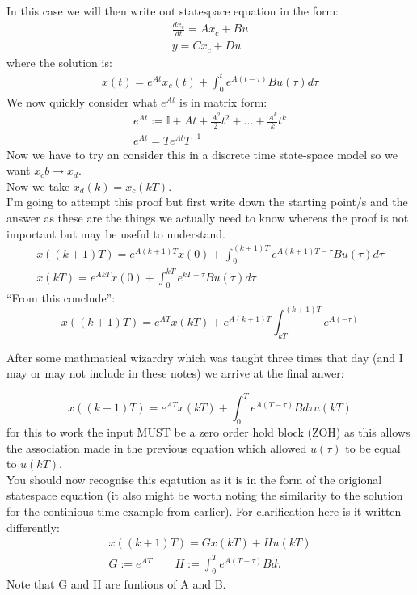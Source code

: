 \documentclass[a4paper,11pt]{article}
\begin{document}
In this case we will then write out statespace equation in the form: 
\begin{gather}
	\frac{dx_c}{dt}= Ax_c+Bu\\
	y = Cx_c + Du
\end{gather}   
where the solution is:
\begin{gather}
	x(t) =e^{At}x_c(t)+ \int_{0}^t e^{A(t-\tau)}Bu(\tau)d\tau
\end{gather}                                               
We now quickly consider what $e^{At}$ is in matrix form:
\begin{gather}
	e^{At}:=\mathbb{I}+At + \frac{A^2}{2}t^2+...+\frac{A^k}{k}t^{k}\\
	e^{At} = Te^{\Lambda t}T^{-1}
\end{gather}                                                                         
Now we have to try an consider this in a discrete time state-space model so we want $x_cb \rightarrow x_d$.\\
Now we take $x_d(k)=x_c(kT)$.\\
I'm going to attempt this proof but first write down the starting point/s and the answer as these are the things we actually need to know whereas the proof is not important but may be useful to understand.\\
\begin{gather}
	x((k+1)T)= e^{A(k+1)T}x(0) + \int_0^{(k+1)T}e^{A(k+1)T-\tau}Bu(\tau)d\tau	\\
	x(kT)= e^{AkT}x(0) + \int_0^{kT}e^{kT-\tau}Bu(\tau)d\tau	
\end{gather}
``From this conclude'':
\begin{equation}
	x((k+1)T)= e^{AT}x(kT)+ e^{A(k+1)T}\int^{(k+1)T}_{kT}e^{A(-\tau)}
\end{equation}

After some mathmatical wizardry which was taught three times that day (and I may or may not include in these notes) we arrive at the final anwer:

\begin{equation}
	x((k+1)T)=e^{AT}x(kT)+\int^{T}_{0}e^{A(T-\tau)}Bd\tau u(kT)
\end{equation}
for this to work the input MUST be a zero order hold block (ZOH) as this allows the association made in the previous equation which allowed $u(\tau)$ to be equal to $u(kT)$.\\ 
You should now recognise this eqatution as it is in the form of the origional statespace equation (it also might be worth noting the similarity to the solution for the continious time example from earlier). For clarification here is it written differently:
\begin{gather}
	x((k+1)T) = G x(kT) + H u(kT)\\
	G:=e^{AT} \qquad H:=\int^{T}_{0} e^{A(T-\tau)}Bd\tau
\end{gather}
Note that G and H are funtions of A and B.
\end{document}
